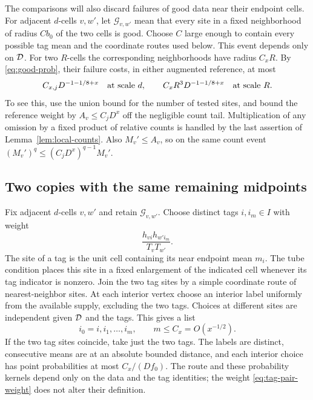 The comparisons will also discard failures of good data near their
endpoint cells.  For adjacent $d$-cells $v,w'$, let
$\mathcal G_{v,w'}$ mean that every site in a fixed neighborhood of
radius $C b_0$ of the two cells is good.  Choose $C$ large enough to
contain every possible tag mean and the coordinate routes used below.
This event depends only on $\mathcal D$.  For two $R$-cells the corresponding
neighborhoods have radius $C_xR$.  By \eqref{eq:good-prob}, their
failure costs, in either augmented reference, at most
\begin{equation}\label{eq:good-omission}
 C_{x,j}D^{-1-1/8+x}\quad\hbox{at scale }d,
 \qquad C_xR^3D^{-1-1/8+x}\quad\hbox{at scale }R.
\end{equation}
To see this, use the union bound for the number of tested sites, and
bound the reference weight by $A_v\le C_jD^x$ off the negligible count
tail.  Multiplication of any omission by a fixed product of relative
counts is handled by the last assertion of Lemma~\ref{lem:local-counts}.
Also $M_v'\le A_v$, so on the same count event
$(M_v')^q\le(C_jD^x)^{q-1}M_v'$.

\subsection{Two copies with the same remaining midpoints}

Fix adjacent $d$-cells $v,w'$ and retain $\mathcal G_{v,w'}$.
Choose distinct tags $i,i_m\in I$ with weight
\begin{equation}\label{eq:tag-pair-weight}
                         \frac{h_{vi}h_{w'i_m}}{T_vT_{w'}}.
\end{equation}
The site of a tag is the unit cell containing its near endpoint mean
$m_i$.  The tube condition places this site in a fixed enlargement of
the indicated cell whenever its tag indicator is nonzero.  Join the
two tag sites by a simple coordinate route of nearest-neighbor sites.
At each interior vertex choose an interior label uniformly from the
available supply, excluding the two tags.  Choices at different sites
are independent given $\mathcal D$ and the tags.  This gives a list
\begin{equation}\label{eq:local-list}
                 i_0=i,i_1,\ldots,i_m,
 \qquad m\le C_x=O(x^{-1/2}).
\end{equation}
If the two tag sites coincide, take just the two tags.  The labels are
distinct, consecutive means are at an absolute bounded distance, and
each interior choice has point probabilities at most $C_x/(Df_0)$.
The route and these probability kernels depend only on the data and
the tag identities; the weight \eqref{eq:tag-pair-weight} does not
alter their definition.

